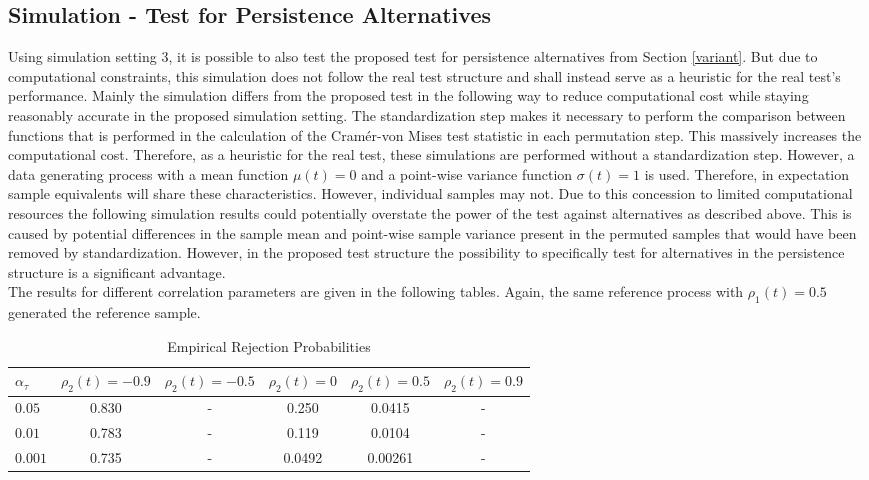 \documentclass[12pt, a4paper]{article}
\theoremstyle{MAstyle} \newtheorem{assumption}{Assumption}[section]
\theoremstyle{MAstyle} \newtheorem{definition}{Definition}[section]
\theoremstyle{MAstyle} \newtheorem{theorem}{Theorem}[section]
\begin{document}
		\subsection{Simulation - Test for Persistence Alternatives}\label{sim_persistence}
		Using simulation setting 3, it is possible to also test the proposed test for persistence alternatives from Section \ref{variant}. But due to computational constraints, this simulation does not follow the real test structure and shall instead serve as a heuristic for the real test's performance. Mainly the simulation differs from the proposed test in the following way to reduce computational cost while staying reasonably accurate in the proposed simulation setting. The standardization step makes it necessary to perform the comparison between functions that is performed in the calculation of the Cram\'{e}r-von Mises test statistic in each permutation step. This massively increases the computational cost. Therefore, as a heuristic for the real test, these simulations are performed without a standardization step. However, a data generating process with a mean function $\mu(t) = 0$ and a point-wise variance function $\sigma(t) = 1$ is used.
		Therefore, in expectation sample equivalents will share these characteristics. However, individual samples may not. Due to this concession to limited computational resources the following simulation results could potentially overstate the power of the test against alternatives as described above. This is caused by potential differences in the sample mean and point-wise sample variance present in the permuted samples that would have been removed by standardization. 
		However, in the proposed test structure the possibility to specifically test for alternatives in the persistence structure is a significant advantage.\\
	
		The results for different correlation parameters are given in the following tables. Again, the same reference process with $\rho_1(t) = 0.5$ generated the reference sample.
		\begin{table}[H]
			\centering
			\begin{tabular}{lccccc}\toprule
				$\alpha_{\tau}$ &$\rho_2(t) = -0.9$ &$\rho_2(t) = -0.5$ &$\rho_2(t) = 0$ &$\rho_2(t) = 0.5$ &$\rho_2(t) = 0.9$\\
				\midrule
				$0.05$	& 0.830 & -  &  0.250	& 0.0415   & - \\
				$0.01$ 	& 0.783	& -  &  0.119	& 0.0104   & -  \\
				$0.001$	& 0.735	& -  &  0.0492	& 0.00261  & -  \\
				\bottomrule
			\end{tabular}
			\caption{Empirical Rejection Probabilities}
		\end{table}
	                                          	
\end{document}
